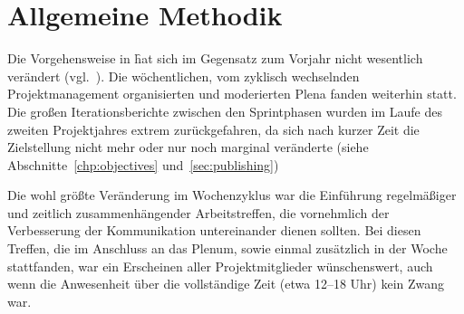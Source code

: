 \section{Allgemeine Methodik}
\authors{\DM}{\MW \and \JF}

Die Vorgehensweise in \f hat sich im Gegensatz zum Vorjahr nicht wesentlich
verändert (vgl.~\cite[Kapitel~2, \enquote{Projekt-Organisation}]{fidius}).
Die wöchentlichen, vom zyklisch wechselnden Projektmanagement
organisierten und moderierten Plena fanden weiterhin statt. Die großen
Iterationsberichte zwischen den Sprintphasen wurden im Laufe des zweiten
Projektjahres extrem zurückgefahren, da sich nach kurzer Zeit die Zielstellung
nicht mehr oder nur noch marginal veränderte (siehe
Abschnitte~\ref{chp:objectives} und~\ref{sec:publishing})

Die wohl größte Veränderung im Wochenzyklus war die Einführung regelmäßiger 
und zeitlich zusammenhängender Arbeitstreffen, die vornehmlich der Verbesserung
der Kommunikation untereinander dienen sollten. Bei diesen Treffen, die im 
Anschluss an das Plenum, sowie einmal zusätzlich in der Woche stattfanden, war 
ein Erscheinen aller Projektmitglieder wünschenswert, auch wenn die 
Anwesenheit über die vollständige Zeit (etwa 12--18 Uhr) kein Zwang war.
